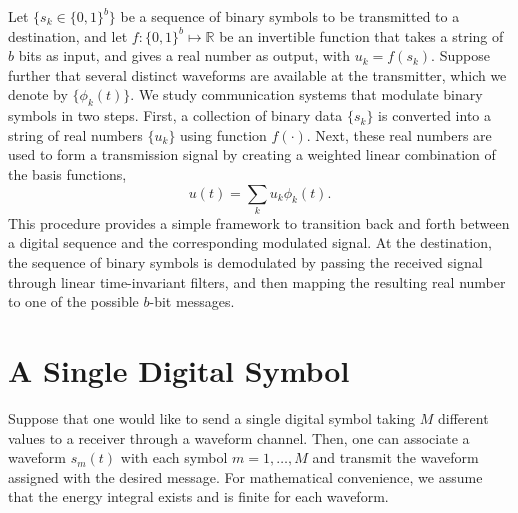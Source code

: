 Let $\{ s_k \in \{ 0, 1 \}^b \}$ be a sequence of binary symbols to be transmitted to a destination, and let $f : \{ 0, 1 \}^b \mapsto \mathbb{R}$ be an invertible function that takes a string of $b$ bits as input, and gives a real number as output, with $u_k = f(s_k)$.
Suppose further that several distinct waveforms are available at the transmitter, which we denote by $\{ \phi_k (t) \}$.
We study communication systems that modulate binary symbols in two steps.
First, a collection of binary data $\{ s_k \}$ is converted into a string of real numbers $\{ u_k \}$ using function $f(\cdot)$.
Next, these real numbers are used to form a transmission signal by creating a weighted linear combination of the basis functions,
\begin{equation*}
u(t) = \sum_k u_k \phi_k(t) .
\end{equation*}
This procedure provides a simple framework to transition back and forth between a digital sequence and the corresponding modulated signal.
At the destination, the sequence of binary symbols is demodulated by passing the received signal through linear time-invariant filters, and then mapping the resulting real number to one of the possible $b$-bit messages.
\fi

\section{A Single Digital Symbol}

Suppose that one would like to send a single digital symbol taking $M$ different values to a receiver through a waveform channel.
Then, one can associate a waveform $s_m (t)$ with each symbol $m=1,\ldots,M$ and transmit the waveform assigned with the desired message.
For mathematical convenience, we assume that the energy integral exists and is finite for each waveform.

